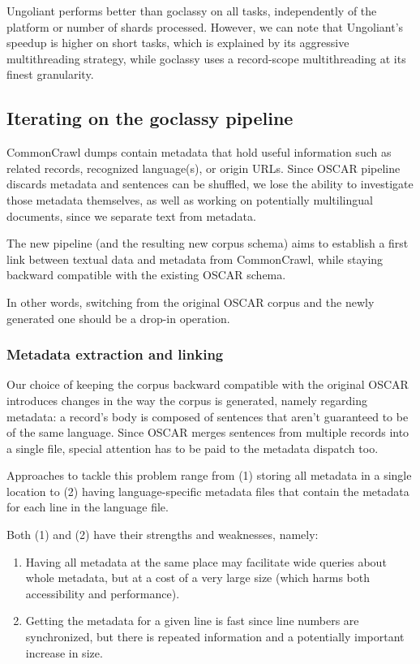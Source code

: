 Ungoliant performs better than goclassy on all tasks, independently of the platform or number of shards processed. However, we can note that Ungoliant's speedup is higher on short tasks, which is explained by its aggressive multithreading strategy, while goclassy uses a record-scope multithreading at its finest granularity.


\subsection{Iterating on the goclassy pipeline}


CommonCrawl dumps contain metadata that hold useful information such as related records, recognized language(s), or origin URLs. Since OSCAR pipeline discards metadata and sentences can be shuffled, we lose the ability to investigate those metadata themselves, as well as working on potentially multilingual documents, since we separate text from metadata.

The new pipeline (and the resulting new corpus schema) aims to establish a first link between textual data and metadata from CommonCrawl, while staying backward compatible with the existing OSCAR schema.

In other words, switching from the original OSCAR corpus and the newly generated one should be a drop-in operation.

\subsubsection{Metadata extraction and linking}
Our choice of keeping the corpus backward compatible with the original OSCAR introduces changes in the way the corpus is generated, namely regarding metadata: a record's body is composed of sentences that aren't guaranteed to be of the same language.
Since OSCAR merges sentences from multiple records into a single file, special attention has to be paid to the metadata dispatch too.

Approaches to tackle this problem range from (1) storing all metadata in a single location to (2) having language-specific metadata files that contain the metadata for each line in the language file.

Both (1) and (2) have their strengths and weaknesses, namely:
\begin{enumerate}
    \item Having all metadata at the same place may facilitate wide queries about whole metadata, but at a cost of a very large size (which harms both accessibility and performance).
    \item Getting the metadata for a given line is fast since line numbers are synchronized, but there is repeated information and a potentially important increase in size.
\end{enumerate}


